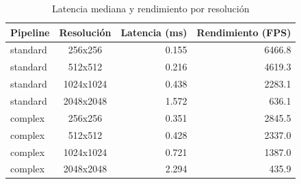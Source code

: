\begin{table}[htbp]
\centering
\renewcommand{\arraystretch}{1.2}
\setlength{\tabcolsep}{7pt}
\begin{tabular}{|l|c|r|r|}
\hline
\rowcolor[gray]{0.90}
\textbf{Pipeline} & \textbf{Resolución} & \textbf{Latencia (ms)} & \textbf{Rendimiento (FPS)} \\
\hline
standard & 256x256 & 0.155 & 6466.8 \\
\hline
standard & 512x512 & 0.216 & 4619.3 \\
\hline
standard & 1024x1024 & 0.438 & 2283.1 \\
\hline
standard & 2048x2048 & 1.572 & 636.1 \\
\hline
complex & 256x256 & 0.351 & 2845.5 \\
\hline
complex & 512x512 & 0.428 & 2337.0 \\
\hline
complex & 1024x1024 & 0.721 & 1387.0 \\
\hline
complex & 2048x2048 & 2.294 & 435.9 \\
\hline
\end{tabular}
\caption{Latencia mediana y rendimiento por resolución}
\label{tab:resolution_latency_fps_equipo1_float32}
\end{table}
